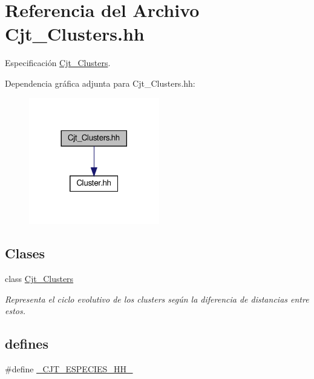 \hypertarget{_cjt___clusters_8hh}{}\section{Referencia del Archivo Cjt\+\_\+\+Clusters.\+hh}
\label{_cjt___clusters_8hh}


Especificación \hyperlink{class_cjt___clusters}{Cjt\+\_\+\+Clusters}.  


Dependencia gráfica adjunta para Cjt\+\_\+\+Clusters.\+hh\+:
\nopagebreak
\begin{figure}[H]
\begin{center}
\leavevmode
\includegraphics[width=161pt]{_cjt___clusters_8hh__incl}
\end{center}
\end{figure}
\subsection*{Clases}
\begin{DoxyCompactItemize}
\item 
class \hyperlink{class_cjt___clusters}{Cjt\+\_\+\+Clusters}
\begin{DoxyCompactList}\small\item\em Representa el ciclo evolutivo de los clusters según la diferencia de distancias entre estos. \end{DoxyCompactList}\end{DoxyCompactItemize}
\subsection*{defines}
\begin{DoxyCompactItemize}
\item 
\#define \hyperlink{_cjt___clusters_8hh_a1a1fe71433995a3b24bda7fea6e55fb1}{\+\_\+\+C\+J\+T\+\_\+\+E\+S\+P\+E\+C\+I\+E\+S\+\_\+\+H\+H\+\_\+}
\end{DoxyCompactItemize}


